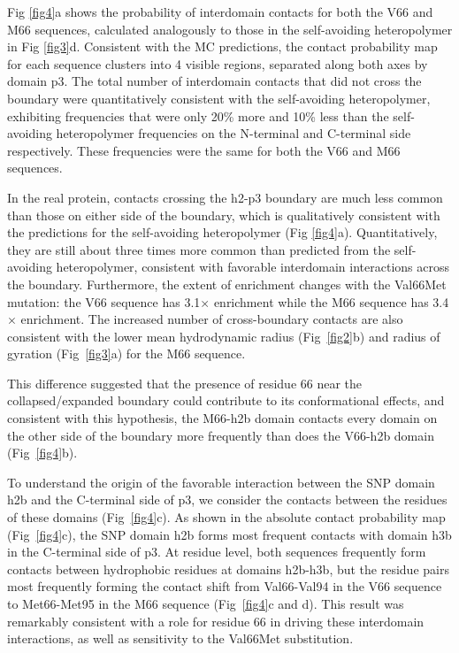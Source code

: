 \documentclass[10pt,letterpaper]{article}
\begin{document}
Fig \ref{fig4}a shows the probability of interdomain contacts for both the V66 and M66 sequences, calculated analogously to those in the self-avoiding heteropolymer in Fig \ref{fig3}d. Consistent with the MC predictions, the contact probability map for each sequence clusters into 4 visible regions, separated along both axes by domain p3. The total number of interdomain contacts that did not cross the boundary were quantitatively consistent with the self-avoiding heteropolymer, exhibiting frequencies that were only 20\% more and 10\% less than the self-avoiding heteropolymer frequencies on the N-terminal and C-terminal side respectively. These frequencies were the same for both the V66 and M66 sequences.    

In the real protein, contacts crossing the h2-p3 boundary are much less common than those on either side of the boundary, which is qualitatively consistent with the predictions for the self-avoiding heteropolymer (Fig \ref{fig4}a). Quantitatively, they are still about three times more common than predicted from the self-avoiding heteropolymer, consistent with favorable interdomain interactions across the boundary. Furthermore, the extent of enrichment changes with the Val66Met mutation: the V66 sequence has 3.1$\times$ enrichment while the M66 sequence has 3.4$\times$ enrichment. The increased number of cross-boundary contacts are also consistent with the lower mean hydrodynamic radius (Fig~\ref{fig2}b) and radius of gyration (Fig~\ref{fig3}a) for the M66 sequence. 

This difference suggested that the presence of residue 66 near the collapsed/expanded boundary could contribute to its conformational effects, and consistent with this hypothesis, the M66-h2b domain contacts every domain on the other side of the boundary more frequently than does the V66-h2b domain (Fig~\ref{fig4}b). 

To understand the origin of the favorable interaction between the SNP domain h2b and the C-terminal side of p3, we consider the contacts between the residues of these domains (Fig~\ref{fig4}c). As shown in the absolute contact probability map (Fig~\ref{fig4}c), the SNP domain h2b forms most frequent contacts with domain h3b in the C-terminal side of p3. At residue level, both sequences frequently form contacts between hydrophobic residues at domains h2b-h3b, but the residue pairs most frequently forming the contact shift from Val66-Val94 in the V66 sequence to Met66-Met95 in the M66 sequence (Fig~\ref{fig4}c and d). This result was remarkably consistent with a role for residue 66 in driving these interdomain interactions, as well as sensitivity to the Val66Met substitution.  
\end{document}
